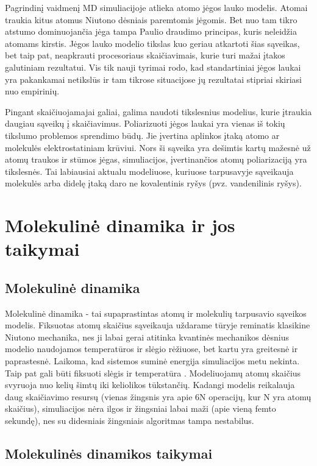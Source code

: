 \documentclass[runningheads]{llncs}
\begin{document}
Pagrindinį vaidmenį MD simuliacijoje atlieka atomo jėgos lauko modelis.
Atomai traukia kitus atomus Niutono dėsniais paremtomis jėgomis.
Bet nuo tam tikro atstumo dominuojančia jėga tampa Paulio draudimo principas, kuris neleidžia atomams kirstis.
Jėgos lauko modelio tikslas kuo geriau atkartoti šias sąveikas, bet taip pat, neapkrauti procesoriaus skaičiavimais, kurie turi mažai įtakos galutiniam rezultatui.
Vis tik nauji tyrimai rodo, kad standartiniai jėgos laukai yra pakankamai netikslūs ir tam tikrose situacijose jų rezultatai stipriai skiriasi nuo empirinių.

Pingant skaičiuojamajai galiai, galima naudoti tikslesnius modelius, kurie įtraukia daugiau sąveikų į skaičiavimus.
Poliarizuoti jėgos laukai yra vienas iš tokių tikslumo problemos sprendimo būdų.
Jie įvertina aplinkos įtaką atomo ar molekulės elektrostatiniam krūviui.
Nors ši sąveika yra dešimtis kartų mažesnė už atomų traukos ir stūmos jėgas, simuliacijos, įvertinančios atomų poliarizaciją yra tikslesnės.
Tai labiausiai aktualu modeliuose, kuriuose tarpusavyje sąveikauja molekulės arba didelę įtaką daro ne kovalentinis ryšys (pvz. vandenilinis ryšys).


\section{Molekulinė dinamika ir jos taikymai}

\subsection{Molekulinė dinamika}

Molekulinė dinamika - tai supaprastintas atomų ir molekulių tarpusavio sąveikos modelis.
Fiksuotas atomų skaičius sąveikauja uždarame tūryje reminatis klasikine Niutono mechanika,
nes ji labai gerai atitinka kvantinės mechanikos dėsnius modelio naudojamos temperatūros ir slėgio rėžiuose,
bet kartu yra greitesnė ir paprastesnė.
Laikoma, kad sistemos suminė energija simuliacijos metu nekinta.
Taip pat gali būti fiksuoti slėgis ir temperatūra \cite{ref_molmod}.
Modeliuojamų atomų skaičius svyruoja nuo kelių šimtų iki keliolikos tūkstančių.
Kadangi modelis reikalauja daug skaičiavimo resursų (vienas žingsnis yra apie 6N operacijų, kur N yra atomų skaičius),
simuliacijos nėra ilgos ir žingsniai labai maži (apie vieną femto sekundę), nes su didesniais žingsniais algoritmas tampa nestabilus.


\subsection{Molekulinės dinamikos taikymai}
\end{document}
